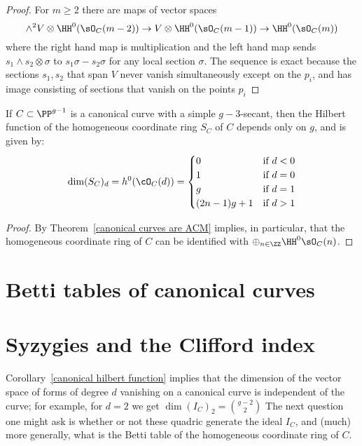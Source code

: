 \begin{proof}
For $m\geq 2$ there are maps of vector spaces
$$
\wedge^{2} V\otimes \HH^{0}(\sO_{C}(m-2)) \to V\otimes \HH^{0}(\sO_{C}(m-1)) 
\to \HH^{0}(\sO_{C}(m))
$$
where the right hand map is multiplication and the left hand map sends
$s_{1}\wedge s_{2}\otimes \sigma$ to $s_{1}\sigma-s_{2}\sigma$ for any local section $\sigma$.
The sequence is exact because the sections $s_{1},s_{2}$ that span $V$ never vanish simultaneously except on the $p_{i}$, and has image  consisting of sections that vanish on the points $p_{i}$

\end{proof}

\begin{corollary}\label{canonical hilbert function}
If $C\subset \PP^{g-1}$ is a canonical curve with a simple $g-3$-secant, then the Hilbert function of the homogeneous coordinate ring $S_{C}$ of  $C$ depends only on $g$, and is given by:
$$
\dim({S_{C}})_{d} = h^{0}(\cO_{C}(d)) = 
\begin{cases}
 0 &\mbox {if } d<0\\
 1 & \mbox {if }  d=0\\
 g & \mbox {if }  d=1\\
 (2n-1)g+1 & \mbox {if }  d>1\\
\end{cases}
$$
\end{corollary}
\begin{proof}
By Theorem~\ref{canonical curves are ACM} implies, in particular, that the homogeneous coordinate ring of $C$ can be identified with $\oplus_{n\in \ZZ}\HH^0\sO_C(n)$.  
\end{proof}

\section{Betti tables of canonical curves}

\section{Syzygies and the Clifford index}


Corollary~\ref{canonical hilbert function} implies that the dimension of the vector space of forms of degree $d$
vanishing on a canonical curve is independent of the curve; for example, for $d=2$ we get
$
\dim ({I_{C}})_{2} = {g-2\choose 2}
$
The next question one might ask is whether or not these quadric generate the ideal $I_{C}$, and (much) more generally, what is the 
Betti table of the homogeneous coordinate ring of $C$.


